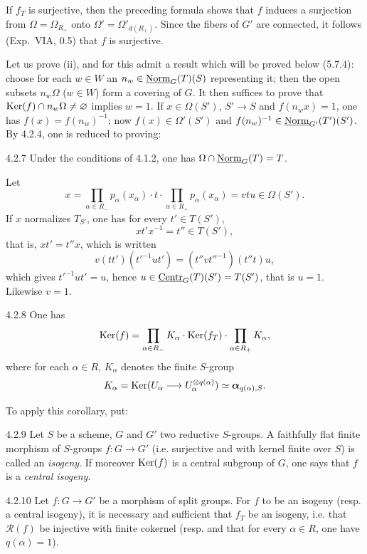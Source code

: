 If $f_T$ is surjective, then the preceding formula shows that $f$ induces a surjection from $\Omega=\Omega_{R_+}$ onto $\Omega'=\Omega'_{d(R_+)}$.{\renewcommand{\thefootnote}{(20)}} Since the fibers of $G'$ are connected, it follows (\cf Exp.~VIA, 0.5) that $f$ is surjective.

Let us prove (ii), and for this admit a result which will be proved below (5.7.4): choose for each $w\in W$ an $n_w\in\underline{\mathrm{Norm}}_G(T)(S)$ representing it; then the open subsets $n_w\Omega$ ($w\in W$) form a covering of $G$. It then suffices to prove that $\operatorname{Ker}(f)\cap n_w\Omega\ne\varnothing$ implies $w=1$. If $x\in\Omega(S')$, $S'\to S$ and $f(n_wx)=1$, one has $f(x)=f(n_w)^{-1}$; now $f(x)\in\Omega'(S')$ and $f(n_w)^{-1}\in\underline{\mathrm{Norm}}_{G'}(T')(S')$. By 4.2.4, one is reduced to proving:
\begin{lemma}{4.2.7}\label{XXII.4.2.7}
Under the conditions of 4.1.2, one has $\Omega\cap\underline{\mathrm{Norm}}_G(T)=T$.
\end{lemma}
Let
\[
x=\prod_{\alpha\in R_-}p_\alpha(x_\alpha)\cdot t\cdot\prod_{\alpha\in R_+}p_\alpha(x_\alpha)=vtu\in\Omega(S').
\]
If $x$ normalizes $T_{S'}$, one has for every $t'\in T(S')$,
\[
xt'x^{-1}=t''\in T(S'),
\]
that is, $xt'=t''x$, which is written
\[
v(tt')(t'^{-1}ut')=(t''vt''^{-1})(t''t)u,
\]
which gives $t'^{-1}ut'=u$, hence $u\in\underline{\mathrm{Centr}}_G(T)(S')=T(S')$, that is $u=1$. Likewise $v=1$.
\begin{corollary}{4.2.8}\label{XXII.4.2.8}
One has
\[
\operatorname{Ker}(f)=\prod_{\alpha\in R_-}K_\alpha\cdot\operatorname{Ker}(f_T)\cdot\prod_{\alpha\in R_+}K_\alpha,
\]
where for each $\alpha\in R$, $K_\alpha$ denotes the finite $S$-group
\[
K_\alpha=\operatorname{Ker}(U_\alpha\longrightarrow U_\alpha^{\otimes q(\alpha)})\simeq\boldsymbol\alpha_{q(\alpha),S}.
\]
\end{corollary}
To apply this corollary, put:
\begin{definition}{4.2.9}\label{XXII.4.2.9}
Let $S$ be a scheme, $G$ and $G'$ two reductive $S$-groups. A faithfully flat finite morphism of $S$-groups $f:G\to G'$ (i.e. surjective and with kernel finite over $S$) is called an \emph{isogeny}. If moreover $\operatorname{Ker}(f)$ is a central subgroup of $G$, one says that $f$ is a \emph{central isogeny}.
\end{definition}
\begin{proposition}{4.2.10}\label{XXII.4.2.10}
Let $f:G\to G'$ be a morphism of split groups. For $f$ to be an isogeny (resp. a central isogeny), it is necessary and sufficient that $f_T$ be an isogeny, i.e. that $\mathscr R(f)$ be injective with finite cokernel (resp. and that for every $\alpha\in R$, one have $q(\alpha)=1$).
\end{proposition}
